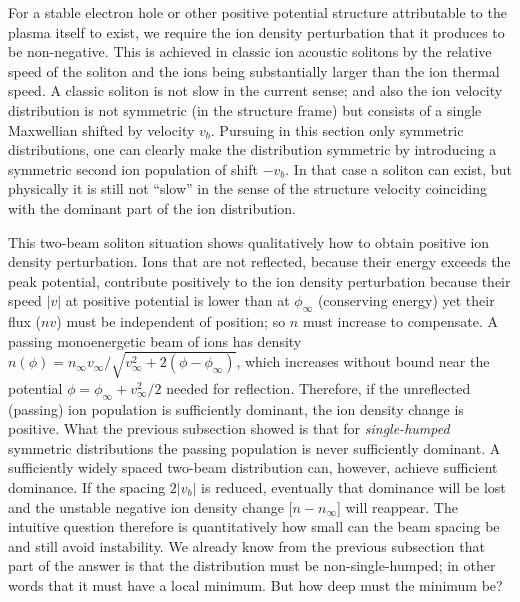 \documentclass[12pt]{article}
\begin{document}
For a stable electron hole or other positive potential
structure attributable to the plasma itself to exist, we require the
ion density perturbation that it produces to be non-negative. This is
achieved in classic ion acoustic solitons by the relative speed of the
soliton and the ions being substantially larger than the ion thermal
speed. A classic soliton is not slow in the current
sense; and also the
ion velocity distribution is not symmetric (in the structure frame)
but consists of a single Maxwellian shifted by velocity
$v_b$. Pursuing in this section only symmetric distributions, one can
clearly make the distribution symmetric by introducing a symmetric
second ion population of shift $-v_b$.  In that case a soliton can
exist, but physically it is still not ``slow'' in the sense of the
structure velocity coinciding with the dominant part of the ion
distribution.

This two-beam soliton situation shows qualitatively how to obtain positive ion
density perturbation. Ions that are not reflected, because their
energy exceeds the peak potential, contribute positively to the ion
density perturbation because their speed $|v|$ at positive potential
is lower than at $\phi_\infty$ (conserving energy) yet their flux
($nv$) must be independent of position; so $n$ must increase to
compensate. A passing monoenergetic beam of ions has density $n(\phi)=n_\infty
v_\infty/\sqrt{v_\infty^2+2(\phi-\phi_\infty)}$, which increases
without bound near the potential $\phi=\phi_\infty+v_\infty^2/2$
needed for reflection. Therefore, if the unreflected (passing) ion population is
sufficiently dominant, the ion density change is positive. What the
previous subsection showed is that for \emph{single-humped} symmetric
distributions the passing population is never sufficiently
dominant. A sufficiently widely spaced two-beam distribution can, however,
achieve sufficient dominance. If the spacing $2|v_b|$ is reduced,
eventually that dominance will be lost and the unstable negative
ion density change [$n-n_\infty$] will reappear. The intuitive question
therefore is quantitatively how small can the beam spacing be and
still avoid instability. We already know from the previous subsection
that part of the answer is that the distribution must be
non-single-humped; in other words that it must have a local minimum. But
how deep must the minimum be?
\end{document}
